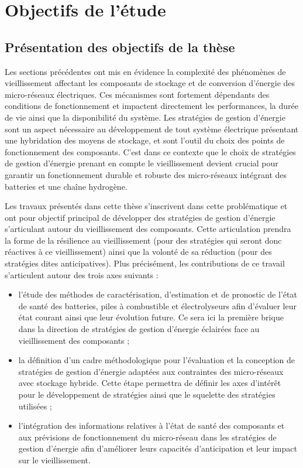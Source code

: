 \section{Objectifs de l'étude}
\subsection{Présentation des objectifs de la thèse}

Les sections précédentes ont mis en évidence la complexité des phénomènes de vieillissement affectant les composants de stockage et de conversion d'énergie des micro-réseaux électriques. Ces mécanismes sont fortement dépendants des conditions de fonctionnement et impactent directement les performances, la durée de vie ainsi que la disponibilité du système. 
Les stratégies de gestion d'énergie sont un aspect nécessaire au développement de tout système électrique présentant une hybridation des moyens de stockage, et sont l'outil du choix des points de fonctionnement des composants. 
C'est dans ce contexte que le choix de stratégies de gestion d'énergie prenant en compte le vieillissement devient crucial pour garantir un fonctionnement durable et robuste des micro-réseaux intégrant des batteries et une chaîne hydrogène.

Les travaux présentés dans cette thèse s'inscrivent dans cette problématique et ont pour objectif principal de développer des stratégies de gestion d'énergie s'articulant autour du vieillissement des composants. Cette articulation prendra la forme de la résilience au vieillissement (pour des stratégies qui seront donc réactives à ce vieillissement) ainsi que la volonté de sa réduction (pour des stratégies dites anticipatives). Plus précisément, les contributions de ce travail s'articulent autour des trois axes suivants :

\begin{itemize}
    \item l'étude des méthodes de caractérisation, d'estimation et de pronostic de l'état de santé des batteries, piles à combustible et électrolyseurs afin d'évaluer leur état courant ainsi que leur évolution future. Ce sera ici la première brique dans la direction de stratégies de gestion d'énergie éclairées face au vieillissement des composants ;

    \item la définition d'un cadre méthodologique pour l'évaluation et la conception de stratégies de gestion d'énergie adaptées aux contraintes des micro-réseaux avec stockage hybride. Cette étape permettra de définir les axes d'intérêt pour le développement de stratégies ainsi que le squelette des stratégies utilisées ;

    \item l'intégration des informations relatives à l'état de santé des composants et aux prévisions de fonctionnement du micro-réseau dans les stratégies de gestion d'énergie afin d'améliorer  leurs capacités d'anticipation et leur impact sur le vieillissement.
\end{itemize}

